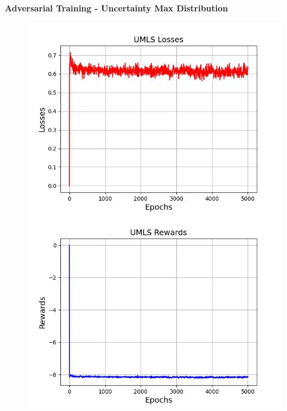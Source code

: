 \textbf{Adversarial Training - Uncertainty Max Distribution}\\
\begin{figure}
    \centering
    \begin{minipage}{.5\textwidth}
      \centering
      \includegraphics[width=0.9\linewidth]{figures/results/gan_train/pretrained/uncertainty/max_distribution/entropy/umls/gan_train_umls_losses.png}
    \end{minipage}%
    \begin{minipage}{.5\textwidth}
      \centering
      \includegraphics[width=0.9\linewidth]{figures/results/gan_train/pretrained/uncertainty/max_distribution/entropy/umls/gan_train_umls_rewards.png}
    \end{minipage}
    \begin{minipage}{.5\textwidth}
      \centering

\end{minipage}
\end{figure}
